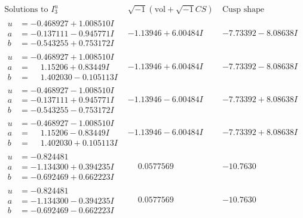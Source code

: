 \documentclass[1p]{elsarticle_modified}
\theoremstyle{definition}
\newcommand{\I}{\sqrt{-1}}
\begin{document}
$$\begin{array}{c|c|c}  
\text{Solutions to }I^u_{3}& \I (\text{vol} + \sqrt{-1}CS) & \text{Cusp shape}\\
 \hline 
\begin{aligned}
u &= -0.468927 + 1.008510 I \\
a &= -0.137111 - 0.945771 I \\
b &= -0.543255 + 0.753172 I\end{aligned}
 & -1.13946 + 6.00484 I & -7.73392 - 8.08638 I \\ \hline\begin{aligned}
u &= -0.468927 + 1.008510 I \\
a &= \phantom{-}1.15206 + 0.83449 I \\
b &= \phantom{-}1.402030 - 0.105113 I\end{aligned}
 & -1.13946 + 6.00484 I & -7.73392 - 8.08638 I \\ \hline\begin{aligned}
u &= -0.468927 - 1.008510 I \\
a &= -0.137111 + 0.945771 I \\
b &= -0.543255 - 0.753172 I\end{aligned}
 & -1.13946 - 6.00484 I & -7.73392 + 8.08638 I \\ \hline\begin{aligned}
u &= -0.468927 - 1.008510 I \\
a &= \phantom{-}1.15206 - 0.83449 I \\
b &= \phantom{-}1.402030 + 0.105113 I\end{aligned}
 & -1.13946 - 6.00484 I & -7.73392 + 8.08638 I \\ \hline\begin{aligned}
u &= -0.824481\phantom{ +0.000000I} \\
a &= -1.134300 + 0.394235 I \\
b &= -0.692469 + 0.662223 I\end{aligned}
 & \phantom{-}0.0577569\phantom{ +0.000000I} & -10.7630\phantom{ +0.000000I} \\ \hline\begin{aligned}
u &= -0.824481\phantom{ +0.000000I} \\
a &= -1.134300 - 0.394235 I \\
b &= -0.692469 - 0.662223 I\end{aligned}
 & \phantom{-}0.0577569\phantom{ +0.000000I} & -10.7630\phantom{ +0.000000I} \\ \hline\begin{aligned}

\end{aligned}
\end{array}$$
\end{document}
